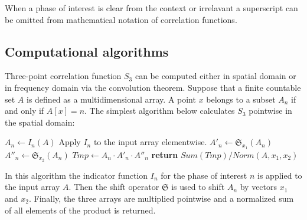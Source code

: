\documentclass[reprint,amsmath,amssymb,aps,pre,showkeys,showpacs]{revtex4-1}
\begin{document}
When a phase of interest is clear from the context or irrelavant a superscript
can be omitted from mathematical notation of correlation functions.

\subsection{Computational algorithms}
Three-point correlation function $S_3$ can be computed either in spatial domain
or in frequency domain via the convolution theorem. Suppose that a finite
countable set $A$ is defined as a multidimensional array. A point $x$ belongs to
a subset $A_n$ if and only if $A[x] = n$. The simplest algorithm below
calculates $S_3$ pointwise in the spatial domain:
\begin{algorithmic}[1]
  \State $A_n \gets I_n (A)$
  \Comment Apply $I_n$ to the input array elementwise.
  \State $A'_n \gets \mathfrak{S}_{x_1}(A_n)$
  \State $A''_n \gets \mathfrak{S}_{x_2}(A_n)$
  \State $Tmp \gets A_n \cdot A'_n \cdot A''_n$
  \State \textbf{return} $Sum(Tmp) / Norm(A, x_1, x_2)$
  \EndProcedure
\end{algorithmic}
In this algorithm the indicator function $I_n$ for the phase of interest $n$ is
applied to the input array $A$. Then the shift operator $\mathfrak{S}$ is used
to shift $A_n$ by vectors $x_1$ and $x_2$. Finally, the three arrays are
multiplied pointwise and a normalized sum of all elements of the product is
returned.
\end{document}
